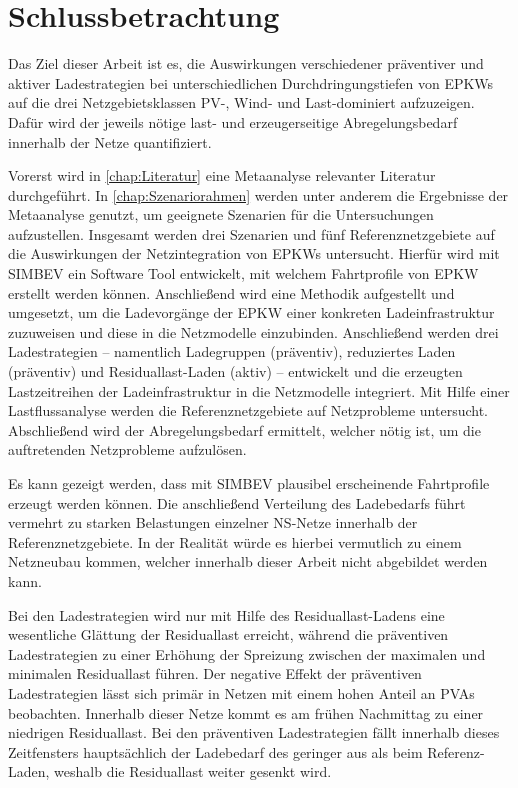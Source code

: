 \section{Schlussbetrachtung}\label{chap:schlussbetrachtung}

Das Ziel dieser Arbeit ist es, die Auswirkungen verschiedener präventiver und aktiver Ladestrategien bei unterschiedlichen Durchdringungstiefen von \glspl{EPKW} auf die drei Netzgebietsklassen \gls{PV}-, Wind- und Last-dominiert aufzuzeigen.
Dafür wird der jeweils nötige last- und erzeugerseitige Abregelungsbedarf innerhalb der Netze quantifiziert.\medskip

Vorerst wird in \autoref{chap:Literatur} eine Metaanalyse relevanter Literatur durchgeführt.
In \autoref{chap:Szenariorahmen} werden unter anderem die Ergebnisse der Metaanalyse genutzt, um geeignete Szenarien für die Untersuchungen aufzustellen.
Insgesamt werden drei Szenarien und fünf Referenznetzgebiete auf die Auswirkungen der Netzintegration von \glspl{EPKW} untersucht.
Hierfür wird mit \gls{SIMBEV} ein Software Tool entwickelt, mit welchem Fahrtprofile von \gls{EPKW} erstellt werden können.
Anschließend wird eine Methodik aufgestellt und umgesetzt, um die Ladevorgänge der \gls{EPKW} einer konkreten Ladeinfrastruktur zuzuweisen und diese in die Netzmodelle einzubinden.
Anschließend werden drei Ladestrategien {--} namentlich Ladegruppen (präventiv), reduziertes Laden (präventiv) und Residuallast-Laden (aktiv) {--} entwickelt und die erzeugten Lastzeitreihen der Ladeinfrastruktur in die Netzmodelle integriert.
Mit Hilfe einer Lastflussanalyse werden die Referenznetzgebiete auf Netzprobleme untersucht.
Abschließend wird der Abregelungsbedarf ermittelt, welcher nötig ist, um die auftretenden Netzprobleme aufzulösen.\medskip

Es kann gezeigt werden, dass mit \gls{SIMBEV} plausibel erscheinende Fahrtprofile erzeugt werden können.
Die anschließend Verteilung des Ladebedarfs führt vermehrt zu starken Belastungen einzelner \gls{NS}-Netze innerhalb der Referenznetzgebiete.
In der Realität würde es hierbei vermutlich zu einem Netzneubau kommen, welcher innerhalb dieser Arbeit nicht abgebildet werden kann.\medskip

Bei den Ladestrategien wird nur mit Hilfe des Residuallast-Ladens eine wesentliche Glättung der Residuallast erreicht, während die präventiven Ladestrategien zu einer Erhöhung der Spreizung zwischen der maximalen und minimalen Residuallast führen.
Der negative Effekt der präventiven Ladestrategien lässt sich primär in Netzen mit einem hohen Anteil an \glspl{PVA} beobachten.
Innerhalb dieser Netze kommt es am frühen Nachmittag zu einer niedrigen Residuallast.
Bei den präventiven Ladestrategien fällt innerhalb dieses Zeitfensters hauptsächlich der Ladebedarf des \UC \zH geringer aus als beim Referenz-Laden, weshalb die Residuallast weiter gesenkt wird.\medskip

